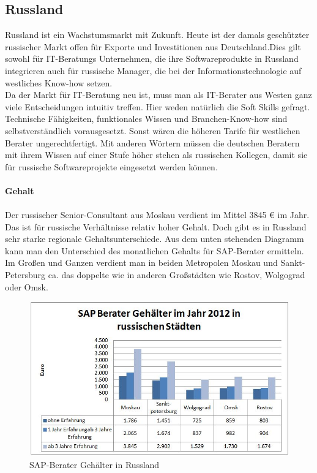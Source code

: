 	\subsection{Russland}
	Russland ist ein Wachstumsmarkt mit Zukunft. Heute ist der damals geschützter russischer Markt offen für Exporte und Investitionen aus Deutschland.Dies gilt sowohl für IT-Beratungs Unternehmen, die ihre Softwareprodukte in Russland integrieren auch für russische Manager, die bei der Informationstechnologie auf westliches Know-how setzen.\\
	Da der Markt für IT-Beratung neu ist, muss man als IT-Berater aus Westen ganz viele Entscheidungen intuitiv treffen. Hier weden natürlich die Soft Skills gefragt. Technische Fähigkeiten, funktionales Wissen und Branchen-Know-how sind selbstverständlich vorausgesetzt. Sonst wären die höheren Tarife für westlichen Berater ungerechtfertigt. Mit anderen Wörtern müssen die deutschen Beratern mit ihrem Wissen auf einer Stufe höher stehen als russischen Kollegen, damit sie für russische Softwareprojekte eingesetzt werden können.\\
	\\
	\textbf{Gehalt}\\ 
	\\
	Der russischer Senior-Consultant aus Moskau verdient im Mittel 3845 € im Jahr. Das ist für russische Verhältnisse relativ hoher Gehalt. Doch gibt es in Russland sehr starke regionale Gehaltsunterschiede. Aus dem unten stehenden Diagramm kann man den Unterschied des monatlichen 
	Gehalts für SAP-Berater ermitteln. Im Großen und Ganzen verdient man in beiden Metropolen Moskau und Sankt-Petersburg ca. das doppelte wie in anderen Großstädten wie Rostov, Wolgograd oder Omsk.
	\\
\begin{figure}[htp]
\centering
\includegraphics[width=0.7\linewidth]{./images/SAP-Berater_Gehalt_RU}
\caption{SAP-Berater Gehälter in Russland}
\label{fig:SAP-Berater_Gehalt_RU}
\end{figure}

